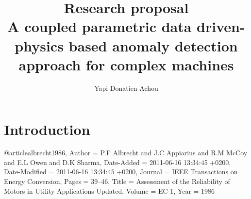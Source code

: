 \documentclass[10pt,a4paper]{article}
\author{Yapi Donatien Achou}
\title{\textbf{Research proposal} \\A coupled parametric data driven-physics based anomaly detection approach for complex machines}
\begin{document}
\maketitle

\section{Introduction}
\cite{albrecht1986}

\newpage


@article{albrecht1986,
	Author = {P.F Albrecht and J.C Appiarius and R.M McCoy and E.L Owen and D.K Sharma},
	Date-Added = {2011-06-16 13:34:45 +0200},
	Date-Modified = {2011-06-16 13:34:45 +0200},
	Journal = {IEEE Transactions on Energy Conversion},
	Pages = {39--46},
	Title = {Assessment of the Reliability of Motors in Utility Applications-Updated},
	Volume = {EC-1},
	Year = {1986}}
\end{document}
